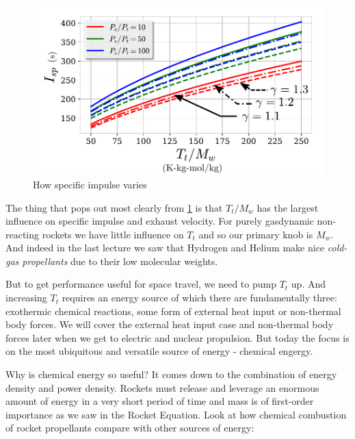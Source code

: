 \documentclass[twocolumn]{memoir} %
\begin{document}
\begin{figure}[h]
    \includegraphics[width=\columnwidth]{C_exp}
    \caption{How specific impulse varies}
    \label{fig:C}
\end{figure}

The thing that pops out most clearly from \cref{fig:C} is that $T_t/M_w$ has the largest
influence on specific impulse and exhaust velocity.  For purely gasdynamic non-reacting rockets
we have little influence on $T_t$ and so our primary knob is $M_w$.  And indeed in the last
lecture we saw that Hydrogen and Helium make nice \emph{cold-gas propellants} due to their 
low molecular weights.  

But to get performance useful for space travel, we need to pump $T_t$ up.  And increasing
$T_t$ requires an energy source of which there are fundamentally three: exothermic chemical
reactions, some form of external heat input or non-thermal body forces.  We will cover the 
external heat input case and non-thermal body forces later when we get to electric and nuclear
propulsion.  But today the focus is on the most ubiquitous and versatile source of energy - 
chemical engergy.

Why is chemical energy so useful?  It comes down to the combination of energy density and
power density.  Rockets must release and leverage an enormous amount of energy in a very
short period of time and mass is of first-order importance as we saw in the Rocket Equation.
Look at how chemical combustion of rocket propellants compare with other sources of energy:
\end{document}
